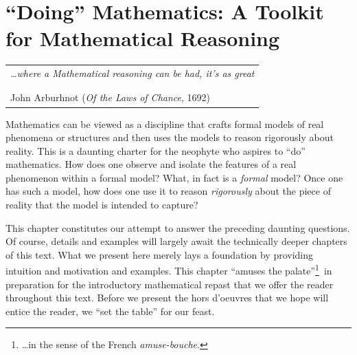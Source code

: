 
\chapter{``Doing'' Mathematics:
A Toolkit for Mathematical Reasoning}
\label{ch:doingmath}


\hfill
\begin{tabular}{l}
{\em \ldots where a Mathematical reasoning can be had, it's as great} \\
\hspace*{.25in}{\em folly to make use of any other, as to grope for a thing in} \\
\hspace*{.25in}{\em the dark, when you have a candle standing by you.} \\
\hfill {\small John Arburhnot ({\it Of the Laws of Chance}, 1692)}
\end{tabular}



\vspace*{.5in}

\noindent
Mathematics can be viewed as a discipline that crafts formal models of real phenomena or structures and then uses the models to reason rigorously about reality.  This is a daunting charter for the neophyte who aspires to ``do'' mathematics.  How does one observe and isolate
the features of a real phenomenon within a formal model?  What, in fact is a {\em formal} model?  Once one has such a model, how does one use it to reason {\em rigorously} about the piece of reality that the model is intended to capture?

\smallskip

This chapter constitutes our attempt to answer the preceding daunting questions.  Of course, details and examples will largely await the technically deeper chapters of this text.  What we present here merely lays a foundation by providing intuition and motivation and examples.  This chapter ``amuses the palate''\footnote{\ldots in the sense of the French {\em amuse-bouche}.}~in preparation for the introductory mathematical repast that we offer the reader throughout this text.   Before we present the hors d'oeuvres that we hope will entice the reader, we ``set the table'' for our feast.

\medskip

